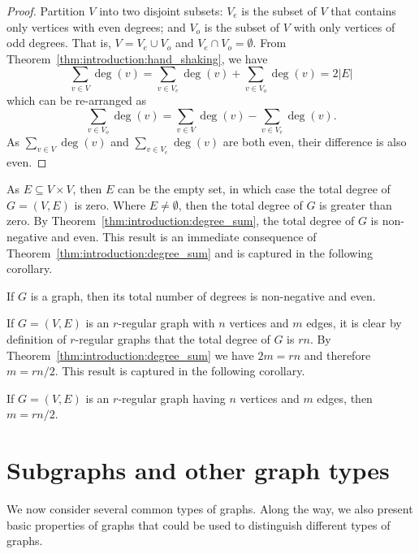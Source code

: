 \begin{proof}
Partition $V$ into two disjoint subsets: $V_e$ is the subset of $V$
that contains only vertices with even degrees; and $V_o$ is the subset
of $V$ with only vertices of odd degrees. That is, $V = V_e \cup V_o$
and $V_e \cap V_o = \emptyset$. From
Theorem~\ref{thm:introduction:hand_shaking}, we have
\[
\sum_{v \in V} \deg(v)
=
\sum_{v \in V_e} \deg(v) + \sum_{v \in V_o} \deg(v)
=
2 |E|
\]
which can be re-arranged as
\[
\sum_{v \in V_o} \deg(v)
=
\sum_{v \in V} \deg(v) - \sum_{v \in V_e} \deg(v).
\]
As $\sum_{v \in V} \deg(v)$ and $\sum_{v \in V_e} \deg(v)$ are both
even, their difference is also even.
\end{proof}

As $E \subseteq V \times V$, then $E$ can be the empty set, in which
case the total degree of $G = (V, E)$ is zero. Where $E \neq
\emptyset$, then the total degree of $G$ is greater than zero. By
Theorem~\ref{thm:introduction:degree_sum}, the total degree of $G$ is
non-negative and even. This result is an immediate consequence of
Theorem~\ref{thm:introduction:degree_sum} and is captured in the
following corollary.

\begin{corollary}
\label{cor:introduction:degree_sum_even}
If $G$ is a graph, then its total number of degrees is non-negative
and even.
\end{corollary}

If $G = (V, E)$ is an $r$-regular graph with $n$ vertices and $m$
edges, it is clear by definition of $r$-regular graphs that the total
degree of $G$ is $rn$. By Theorem~\ref{thm:introduction:degree_sum} we
have $2m = rn$ and therefore $m = rn / 2$. This result is captured in
the following corollary.

\begin{corollary}
If $G = (V, E)$ is an $r$-regular graph having $n$ vertices and $m$
edges, then $m = rn / 2$.
\end{corollary}



\section{Subgraphs and other graph types}
\label{sec:introduction:subgraphs_graph_types}

We now consider several common types of graphs. Along the way, we also
present basic properties of graphs that could be used to distinguish
different types of graphs.


